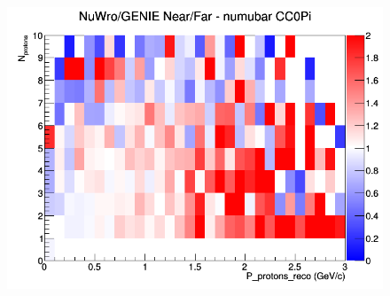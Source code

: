 \documentclass[12pt]{article}
\begin{document}
\begin{figure}[h]
\endminipage
{}
\includegraphics[width=\linewidth]{eff_N_P/LAr/protons/ratios/CC0Pi_NuWro_GENIE_numubar_NF_N_P.png}
\endminipage
\newline
\end{figure}
\clearpage
\end{document}

